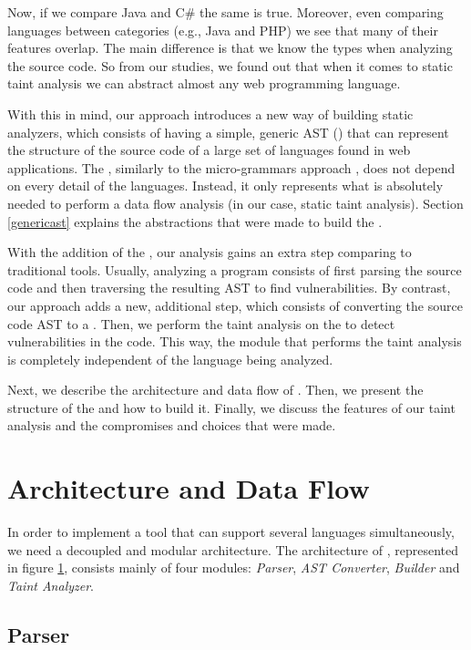 Now, if we compare Java and C\# the same is true. Moreover, even comparing languages between categories (e.g., Java and PHP) we see that many of their features overlap. The main difference is that we know the types when analyzing the source code. So from our studies, we found out that when it comes to static taint analysis we can abstract almost any web programming language. 

With this in mind, our approach introduces a new way of building static analyzers, which consists of having a simple, generic AST (\astname{}) that can represent the structure of the source code of a large set of languages found in web applications. The \astname{}, similarly to the micro-grammars approach \cite{microgrammars}, does not depend on every detail of the languages. Instead, it only represents what is absolutely needed to perform a data flow analysis (in our case, static taint analysis). Section \ref{genericast} explains the abstractions that were made to build the \astname{}.

With the addition of the \astname{}, our analysis gains an extra step comparing to traditional tools. Usually, analyzing a program consists of first parsing the source code and then traversing the resulting AST to find vulnerabilities. By contrast, our approach adds a new, additional step, which consists of converting the source code AST to a \astname{}. Then, we perform the taint analysis on the \astname{} to detect vulnerabilities in the code. This way, the module that performs the taint analysis is completely independent of the language being analyzed. 

Next, we describe the architecture and data flow of \toolname{}. Then, we present the  structure of the \astname{} and how to build it. Finally, we discuss the features of our taint analysis and the compromises and choices that were made.


\section{Architecture and Data Flow}
\label{architecture}


In order to implement a tool that can support several languages simultaneously, we need a decoupled and modular architecture. The architecture of \toolname{}, represented in figure \ref{architecture}, consists mainly of four modules: \textit{Parser}, \textit{AST Converter}, \textit{\astname{} Builder} and \textit{Taint Analyzer}.

\subsection{Parser} 

